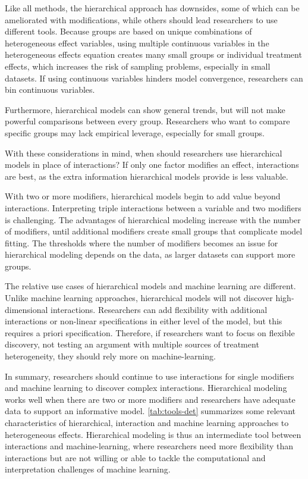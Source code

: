\documentclass[12pt]{article}
\begin{document}
Like all methods, the hierarchical approach has downsides, some of which can be ameliorated with modifications, while others should lead researchers to use different tools. 
Because groups are based on unique combinations of heterogeneous effect variables, using multiple continuous variables in the heterogeneous effects equation creates many small groups or individual treatment effects, which increases the risk of sampling problems, especially in small datasets. 
If using continuous variables hinders model convergence, researchers can bin continuous variables.


Furthermore, hierarchical models can show general trends, but will not make powerful comparisons between every group. 
Researchers who want to compare specific groups may lack empirical leverage, especially for small groups.


With these considerations in mind, when should researchers use hierarchical models in place of interactions?
If only one factor modifies an effect, interactions are best, as the extra information hierarchical models provide is less valuable. 


With two or more modifiers, hierarchical models begin to add value beyond interactions. 
Interpreting triple interactions between a variable and two modifiers is challenging. 
The advantages of hierarchical modeling increase with the number of modifiers, until additional modifiers create small groups that complicate model fitting. 
The thresholds where the number of modifiers becomes an issue for hierarchical modeling depends on the data, as larger datasets can support more groups. 


The relative use cases of hierarchical models and machine learning are different. 
Unlike machine learning approaches, hierarchical models will not discover high-dimensional interactions. 
Researchers can add flexibility with additional interactions or non-linear specifications in either level of the model, but this requires a priori specification. 
Therefore, if researchers want to focus on flexible discovery, not testing an argument with multiple sources of treatment heterogeneity, they should rely more on machine-learning. 


In summary, researchers should continue to use interactions for single modifiers and machine learning to discover complex interactions. 
Hierarchical modeling works well when there are two or more modifiers and researchers have adequate data to support an informative model.  
\autoref{tab:tools-det} summarizes some relevant characteristics of hierarchical, interaction and machine learning approaches to heterogeneous effects. 
Hierarchical modeling is thus an intermediate tool between interactions and machine-learning, where researchers need more flexibility than interactions but are not willing or able to tackle the computational and interpretation challenges of machine learning. 
\end{document}
